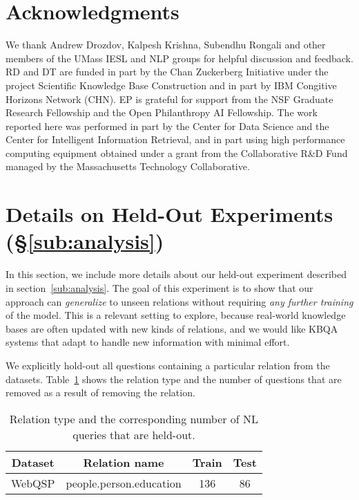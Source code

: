 \documentclass{article}
\begin{document}
\section{Acknowledgments}
We thank Andrew Drozdov, Kalpesh Krishna, Subendhu Rongali and other members of the
UMass IESL and NLP groups for helpful discussion and feedback. RD and DT are funded in part by the Chan Zuckerberg Initiative under the project Scientific Knowledge Base Construction and in part by IBM Congitive Horizons Network (CHN).
EP is grateful for support from the NSF Graduate Research Fellowship and the Open Philanthropy AI Fellowship. The work reported here was performed in part by the Center for Data Science and the Center for Intelligent Information Retrieval, and in part using high performance computing equipment obtained under a grant from the Collaborative R\&D Fund managed by the Massachusetts Technology Collaborative.





\newpage
\onecolumn
\appendix
\section{Details on Held-Out Experiments (\S\ref{sub:analysis})}
\label{sub:held_out_appendix}



In this section, we include more details about our held-out experiment described in section~\ref{sub:analysis}. The goal of this experiment is to show that our approach can \emph{generalize} to unseen relations without requiring \emph{any further training} of the model.
This is a relevant setting to explore, because real-world knowledge bases are often updated with new kinds of relations, and we would like KBQA systems that adapt to handle new information with minimal effort.

We explicitly hold-out all questions containing a particular relation from the datasets. Table~\ref{tab:held_out_stats} shows the relation type and the number of questions that are removed as a result of removing the relation.

\begin{table}[bht]
    \centering
    \begin{tabular}{c c c c} \toprule
         Dataset & Relation name & Train & Test\\\midrule
         WebQSP & people.person.education & 136 & 86 \\\bottomrule
\end{tabular}
    \caption{Relation type and the corresponding number of NL queries that are held-out.}
    \label{tab:held_out_stats}
\end{table}
\end{document}
